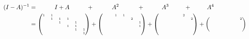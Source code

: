 \documentclass[sigplan,review,acmsmall,nonacm,screen,anonymous]{acmart}\settopmatter{printfolios=false,printccs=false,printacmref=false}
\begin{document}
\begin{align}
(I-A)^{-1} &= \hspace{1cm}I + A \hspace{1cm}+\hspace{1.05cm} A^2 \hspace{1.07cm}+\hspace{1cm} A^3 \hspace{0.9cm}+\hspace{0.9cm} A^4\\
  &=\begin{tiny}\begin{pmatrix}
       1 & 1 &   &   &   &   \\
        & 1  & 1 & 1 &   &   \\
        &   & 1  &   & 1 &   \\
        &   &   & 1  & 1 &   \\
        &   &   &   & 1  & 1 \\
        &   &   &   &   & 1  \\
  \end{pmatrix} + \begin{pmatrix}
              &   & 1 & 1 &   &   \\
              &   &   &   & 2 &   \\
              &   &   &   &   & 1 \\
              &   &   &   &   & 1 \\
              &   &   &   &   &   \\
              &   &   &   &   &   \\
  \end{pmatrix} + \begin{pmatrix}
              &   &   &   & 2 &   \\
              &   &   &   &   & 2 \\
              &   &   &   &   &   \\
              &   &   &   &   &   \\
              &   &   &   &   &   \\
              &   &   &   &   &   \\
  \end{pmatrix} + \begin{pmatrix}
              &   &   &   &   & 2 \\
              &   &   &   &   &   \\
              &   &   &   &   &   \\
              &   &   &   &   &   \\

\end{pmatrix}
\end{tiny}
\end{align}
\end{document}
